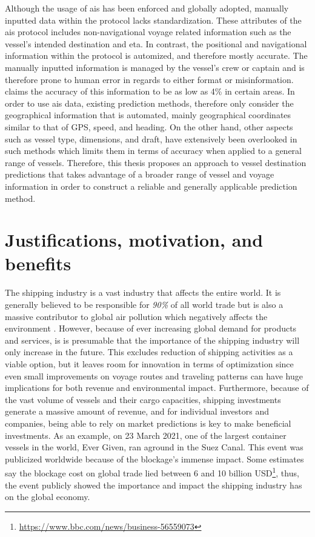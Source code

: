 Although the usage of \acrshort{ais} has been enforced and globally adopted, manually inputted data within the protocol lacks standardization. These attributes of the \acrshort{ais} protocol includes non-navigational \gls{voyage} related information such as the vessel's intended destination and \acrfull{eta}. In contrast, the positional and navigational information within the protocol is automized, and therefore mostly accurate. The manually inputted information is managed by the vessel's crew or captain and is therefore prone to human error in regards to either format or misinformation. \cite{mestl2016} claims the accuracy of this information to be as low as 4\% in certain areas. In order to use \acrshort{ais} data, existing prediction methods, therefore only consider the geographical information that is automated, mainly geographical coordinates similar to that of GPS\@, speed, and heading. On the other hand, other aspects such as vessel type, dimensions, and draft, have extensively been overlooked in such methods which limits them in terms of accuracy when applied to a general range of vessels. Therefore, this thesis proposes an approach to vessel destination predictions that takes advantage of a broader range of vessel and voyage information in order to construct a reliable and generally applicable prediction method.

\section{Justifications, motivation, and benefits}
\label{section:justifications_motivations_benefits}

The shipping industry is a vast industry that affects the entire world. It is generally believed to be responsible for \textit{90\%} of all world trade \parencite{grote2016} but is also a massive contributor to global air pollution which negatively affects the environment \parencite{zheng2016:online}. However, because of ever increasing global demand for products and services, is is presumable that the importance of the shipping industry will only increase in the future. This excludes reduction of shipping activities as a viable option, but it leaves room for innovation in terms of optimization since even small improvements on voyage routes and traveling patterns can have huge implications for both revenue and environmental impact. Furthermore, because of the vast volume of vessels and their cargo capacities, shipping investments generate a massive amount of revenue, and for individual investors and companies, being able to rely on market predictions is key to make beneficial investments. As an example, on 23 March 2021, one of the largest container vessels in the world, Ever Given, ran aground in the Suez Canal. This event was publicized worldwide because of the blockage's immense impact. Some estimates say the blockage cost on global trade lied between 6 and 10 billion USD\footnote{\url{https://www.bbc.com/news/business-56559073}}, thus, the event publicly showed the importance and impact the shipping industry has on the global economy.

